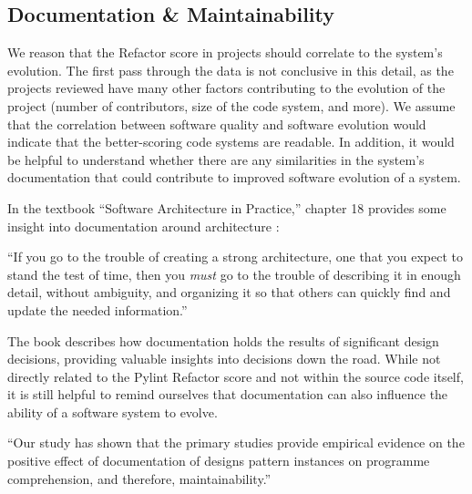\subsection{Documentation \& Maintainability} \label{subDocumentation}


We reason that the Refactor score in projects should correlate to the system's evolution. The first pass through the data is not conclusive in this detail, as the projects reviewed have many other factors contributing to the evolution of the project (number of contributors, size of the code system, and more). We assume that the correlation between software quality and software evolution would indicate that the better-scoring code systems are readable. In addition, it would be helpful to understand whether there are any similarities in the system's documentation that could contribute to improved software evolution of a system.


In the textbook ``Software Architecture in Practice,'' chapter 18 provides some insight into documentation around architecture \cite{book:software-architecture-in-practice}:

\vspace{0.25cm}
\begin{displayquote}
  ``If you go to the trouble of creating a strong architecture, one that you expect to stand the test of time, then you \textit{must} go to the trouble of describing it in enough detail, without ambiguity, and organizing it so that others can quickly find and update the needed information.''
\end{displayquote}
\vspace{0.25cm}

The book describes how documentation holds the results of significant design decisions, providing valuable insights into decisions down the road. While not directly related to the Pylint Refactor score and not within the source code itself, it is still helpful to remind ourselves that documentation can also influence the ability of a software system to evolve.

\vspace{0.25cm}
\begin{displayquote}
  ``Our study has shown that the primary studies provide empirical evidence on the positive effect of documentation of designs pattern instances on programme comprehension, and therefore, maintainability.''
\end{displayquote}

